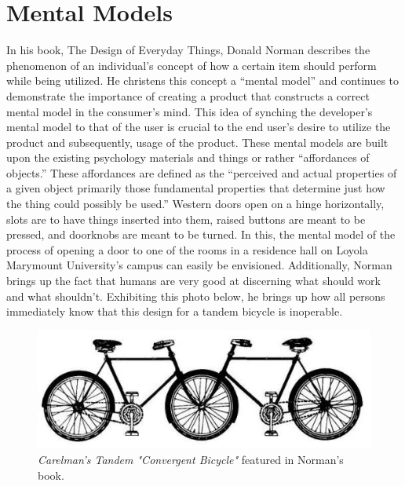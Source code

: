 \documentclass[12pt onesided letterpaper]{report}
\begin{document}
\section*{Mental Models}
In his book, The Design of Everyday Things, Donald Norman describes the phenomenon of an individual’s concept of how a certain item should perform while being utilized.  He christens this concept a “mental model” and continues to demonstrate the importance of creating a product that constructs a correct mental model in the consumer’s mind.  This idea of synching the developer’s mental model to that of the user is crucial to the end user’s desire to utilize the product and subsequently, usage of the product.   These mental models are built upon the existing psychology materials and things or rather “affordances of objects.” \cite[~p. 11]  {norman02}  These affordances are defined as the “perceived and actual properties of a given object primarily those fundamental properties that determine just how the thing could possibly be used.” \cite[~p. 11]  {norman02}  Western doors open on a hinge horizontally, slots are to have things inserted into them, raised buttons are meant to be pressed, and doorknobs are meant to be turned.  In this, the mental model of the process of opening a door to one of the rooms in a residence hall on Loyola Marymount University’s campus can easily be envisioned.  Additionally, Norman brings up the fact that humans are very good at discerning what should work and what shouldn’t.  Exhibiting this photo below, he brings up how all persons immediately know that this design for a tandem bicycle is inoperable.  
\pagebreak
\begin{figure}[hb]
    \centering
    \includegraphics{bicycle}
    \caption{\emph{Carelman's Tandem "Convergent Bicycle"} featured in Norman's book. \cite[~p. 13]  {norman02}}
    
\end{figure}
\end{document}
